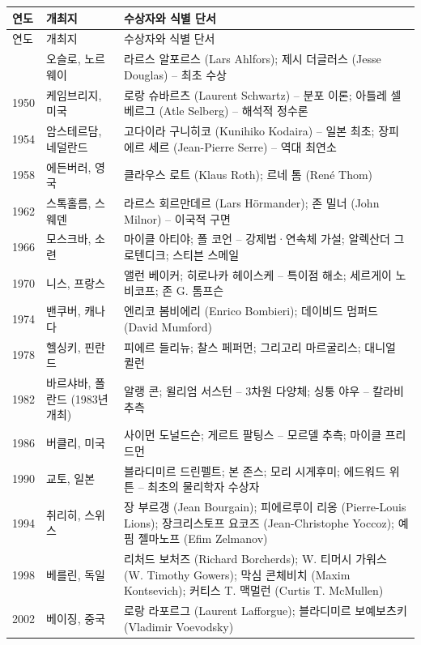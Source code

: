 \begin{center}
\small
\renewcommand{\arraystretch}{1.03}
\begin{longtable}{@{}L{0.075\textwidth}L{0.22\textwidth}L{0.62\textwidth}@{}}
\toprule
연도 & 개최지 & 수상자와 식별 단서\\
\midrule
\endfirsthead
\toprule 연도 & 개최지 & 수상자와 식별 단서\\ \midrule \endhead
\bottomrule{} & 오슬로, 노르웨이 & 라르스 알포르스 (Lars Ahlfors); 제시 더글러스 (Jesse Douglas) -- 최초 수상\\
1950 & 케임브리지, 미국 & 로랑 슈바르츠 (Laurent Schwartz) -- 분포 이론; 아틀레 셀베르그 (Atle Selberg) -- 해석적 정수론\\
1954 & 암스테르담, 네덜란드 & 고다이라 구니히코 (Kunihiko Kodaira) -- 일본 최초; 장피에르 세르 (Jean-Pierre Serre) -- 역대 최연소\\
1958 & 에든버러, 영국 & 클라우스 로트 (Klaus Roth); 르네 톰 (René Thom)\\
1962 & 스톡홀름, 스웨덴 & 라르스 회르만데르 (Lars Hörmander); 존 밀너 (John Milnor) -- 이국적 구면\\
1966 & 모스크바, 소련 & 마이클 아티야; 폴 코언 -- 강제법·연속체 가설; 알렉산더 그로텐디크; 스티븐 스메일\\
1970 & 니스, 프랑스 & 앨런 베이커; 히로나카 헤이스케 -- 특이점 해소; 세르게이 노비코프; 존 G. 톰프슨\\
1974 & 밴쿠버, 캐나다 & 엔리코 봄비에리 (Enrico Bombieri); 데이비드 멈퍼드 (David Mumford)\\
1978 & 헬싱키, 핀란드 & 피에르 들리뉴; 찰스 페퍼먼; 그리고리 마르굴리스; 대니얼 퀼런\\
1982 & 바르샤바, 폴란드 (1983년 개최) & 알랭 콘; 윌리엄 서스턴 -- 3차원 다양체; 싱퉁 야우 -- 칼라비 추측\\
1986 & 버클리, 미국 & 사이먼 도널드슨; 게르트 팔팅스 -- 모르델 추측; 마이클 프리드먼\\
1990 & 교토, 일본 & 블라디미르 드린펠트; 본 존스; 모리 시게후미; 에드워드 위튼 -- 최초의 물리학자 수상자\\
1994 & 취리히, 스위스 & 장 부르갱 (Jean Bourgain); 피에르루이 리옹 (Pierre-Louis Lions); 장크리스토프 요코즈 (Jean-Christophe Yoccoz); 예핌 젤마노프 (Efim Zelmanov)\\
1998 & 베를린, 독일 & 리처드 보처즈 (Richard Borcherds); W. 티머시 가워스 (W. Timothy Gowers); 막심 콘체비치 (Maxim Kontsevich); 커티스 T. 맥멀런 (Curtis T. McMullen)\\
2002 & 베이징, 중국 & 로랑 라포르그 (Laurent Lafforgue); 블라디미르 보예보츠키 (Vladimir Voevodsky)\\

\end{longtable}
\end{center}
